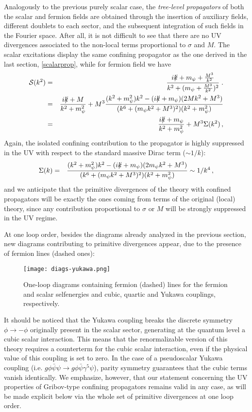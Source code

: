 Analogously to the previous purely scalar case, the \emph{tree-level propagators} of both the
scalar and fermion fields are obtained through the insertion of auxiliary fields,
different doublets to each sector, and the subsequent integration of such fields in the Fourier
space. After all, it is not difficult to see that there are no UV divergences associated to
the non-local terms proportional to $\sigma$ and $M$. The scalar excitations display the same
confining propagator as the one
derived in the last section,  \eqref{scalarprop}, while for fermion field we have
\begin{eqnarray} 
{\cal S}(k^2) & = & \frac{ik \hspace{-1.7mm} / + m_{\psi} + \frac{M^3}{k^2}}{k^2 + (m_{\psi} +
\frac{M^3}{k^2})^2}  \;.\nonumber\\ 
& = &  \frac{ik \hspace{-1.7mm} / + M }{k^2 + m_{\psi}^2} + M^3 \frac{(k^2+m_{\psi}^2)k^2 -(ik \hspace{-1.7mm} / +
m_{\psi})(2Mk^2 + M^3)  }{(k^6 + (m_{\psi} k^2 + M^3)^2)(k^2 + m_{\psi}^2)}
\nonumber\\ 
& = &  \frac{ik \hspace{-1.7mm} / + m_{\psi} }{k^2 + m_{\psi}^2} + M^3 \Sigma(k^2)\,,
\label{fermprop}
\end{eqnarray}
Again, the isolated confining contribution to the propagator is highly suppressed in the UV
with respect to the standard massive Dirac term ($\sim 1/k$):
\begin{eqnarray} 
\Sigma(k)& = &   \frac{(k^2+m_{\psi}^2)k^2 -(ik \hspace{-1.7mm} / + m_{\psi})(2m_{\psi}k^2 + M^3)  }{(k^6 +
(m_{\psi} k^2 + M^3)^2)(k^2 + m_{\psi}^2)}\sim 1/k^4
 \,,
\label{sigma1}
\end{eqnarray}
and we anticipate that the primitive divergences of the theory with confined propagators will
be exactly the ones coming from terms of the original (local) theory, since any contribution
proportional to $\sigma$ or $M$ will be strongly suppressed in the UV regime.

At one loop order, besides the diagrams already analyzed in the previous section, new diagrams contributing to primitive divergences appear, due to the presence of fermion lines (dashed ones):
\begin{figure}[h!]
   \centering
       \texttt{[image: diags-yukawa.png]}
               \caption{One-loop diagrams containing fermion (dashed) lines for the fermion and scalar selfenergies and cubic, quartic and Yukawa couplings, respectively. \label{fermiondiags}}
\end{figure}

It should be noticed that the Yukawa coupling breaks the discrete symmetry $\phi\to -\phi$
originally present in the scalar sector, generating at the quantum level a cubic scalar
interaction. This means that the renormalizable version of this theory requires a counterterm
for the cubic scalar interaction, even if the physical value of this coupling is set to zero.
In the case of a pseudoscalar Yukawa coupling (i.e. $g\phi\bar\psi\psi \to
g\phi\bar{\psi} \gamma^{5} \psi $), parity symmetry guarantees that the cubic terms vanish
identically. We emphasize, however, that our statement concerning the UV properties of
Gribov-type confining propagators remains valid in any case, as will be made explicit below via
the whole set of primitive divergences at one loop order. 

